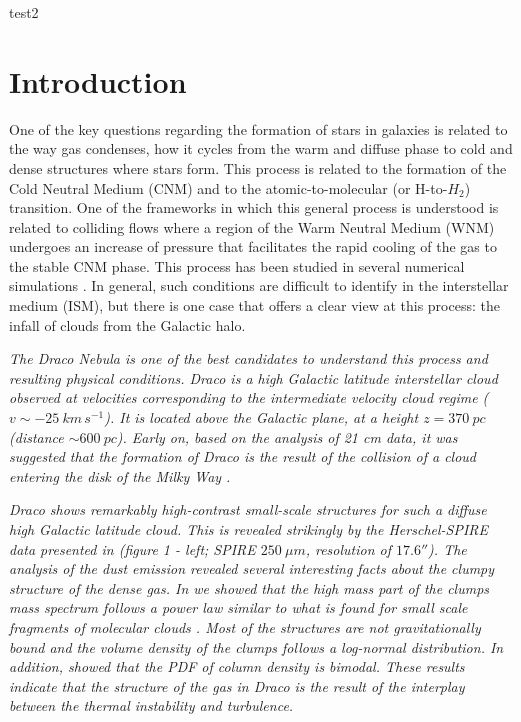 \documentclass[traditabstract]{aa}
\begin{document}
test2

\section{Introduction}

   One of the key questions regarding the formation of stars in galaxies is related to the way gas condenses, how it cycles from the warm and diffuse phase to cold and dense structures where stars form. This process is related to the formation of the Cold Neutral Medium (CNM) and to the atomic-to-molecular (or H-to-$H_2$) transition. One of the frameworks in which this general process is understood is related to colliding flows where a region of the Warm Neutral Medium (WNM) undergoes an increase of pressure that facilitates the rapid cooling of the gas to the stable CNM phase. This process has been studied in several numerical simulations \citep{Hennebelle_1999,Audit_2005,Vazquez_2006,Hennebelle_2007,Inoue_2009,Saury_2014}. In general, such conditions are difficult to identify in the interstellar medium (ISM), but there is one case that offers a clear view at this process: the infall of clouds from the Galactic halo.

\textit{   The Draco Nebula is one of the best candidates to understand this process and resulting physical conditions. Draco is a high Galactic latitude interstellar cloud observed at velocities corresponding to the intermediate velocity cloud regime ($v\sim -25\: km\, s^{-1}$). It is located above the Galactic plane, at a height $z=370\: pc$ (distance $\sim 600\: pc$).  Early on, based on the analysis of 21 cm data, it was suggested that the formation of Draco is the result of the collision of a cloud entering the disk of the Milky Way \citep{Goerigk_1983}.}

\textit{   Draco shows remarkably high-contrast small-scale structures for such a diffuse high Galactic latitude cloud. This is revealed strikingly by the \emph{Herschel}-SPIRE data presented in \cite{MAMD_2017b} (figure 1 - left; SPIRE $250\: \mu m$, resolution of $17.6''$).
The analysis of the dust emission revealed several interesting facts about the clumpy structure of the dense gas. In \cite{MAMD_2017b} we showed that the high mass part of the clumps mass spectrum follows a power law similar to what is found for small scale fragments of molecular clouds \cite{Peretto_2010}. Most of the structures are not gravitationally bound and the volume density of the clumps follows a log-normal distribution. In addition, \cite{Schneider_2017} showed that the PDF of column density is bimodal. These results indicate that the structure of the gas in Draco is the result of the interplay between the thermal instability and turbulence.}
\end{document}
